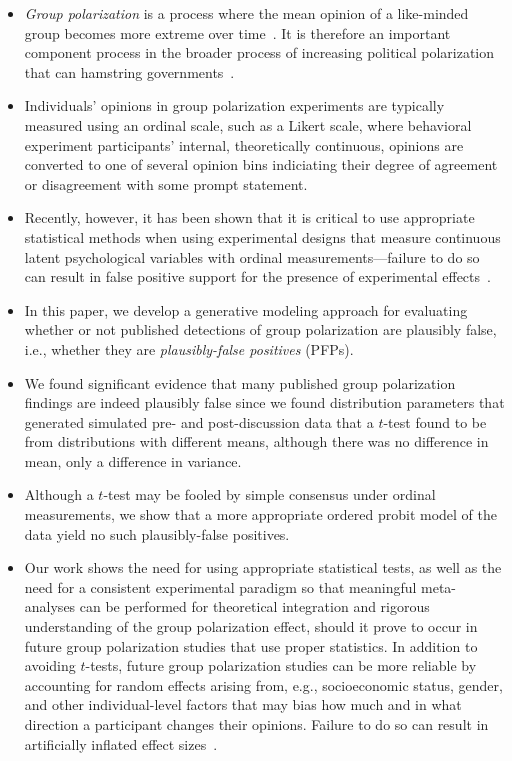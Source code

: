 \documentclass[11pt, letterpaper]{article}
\begin{document}
\begin{itemize}
  \item 
    \emph{Group polarization} is a process where the mean opinion of a 
    like-minded group becomes more extreme over time~\cite{Brown1986,Brown2000}. 
    It is therefore an important component process in
    the broader process of increasing political polarization that can hamstring
    governments~\cite{Mason2018UncivilAgreementBook,Klein2020}.
  \item
    Individuals' opinions in group polarization experiments are typically 
    measured using an ordinal scale, such
    as a Likert scale, where behavioral experiment participants' internal, theoretically
    continuous, opinions are converted to one of several opinion bins indiciating
    their degree of agreement or disagreement with some prompt statement.
  \item
    Recently, however, it has been shown that it is critical to use 
    appropriate statistical methods when using experimental designs that 
    measure continuous latent psychological variables with ordinal
    measurements---failure to do so can result in false positive support for
    the presence of experimental effects~\cite{Liddell2018}.
  \item
    In this paper, we develop a generative modeling approach for evaluating whether or
    not published detections of group polarization are plausibly false, i.e.,
    whether they are \emph{plausibly-false positives} (PFPs). 
  \item
    We found significant evidence that many published group polarization findings
    are indeed plausibly false since we found distribution parameters that
    generated simulated pre- and post-discussion data that a $t$-test found
    to be from distributions with different means, although there was no difference
    in mean, only a difference in variance. 
  \item
    Although a $t$-test may be fooled by simple consensus under ordinal measurements,
    we show that a more appropriate ordered probit model of the data yield no
    such plausibly-false positives.
  \item
    Our work shows the need for using appropriate statistical tests, as well as
    the need for a consistent experimental paradigm so that meaningful meta-analyses
    can be performed for theoretical integration and rigorous understanding of
    the group polarization effect, should it prove to occur in future group
    polarization studies that use proper statistics. In addition to avoiding
    $t$-tests, future group polarization studies can be more reliable by
    accounting for random effects arising from, e.g., socioeconomic status,
    gender, and other individual-level factors that may bias how much and in what
    direction a participant changes their opinions. Failure to do so can result 
    in artificially inflated effect sizes~\cite{Yarkoni2021}.
\end{itemize}
\end{document}
